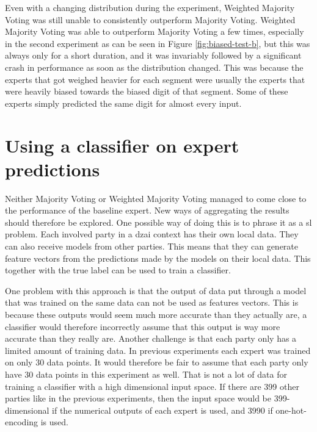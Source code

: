 Even with a changing distribution during the experiment, Weighted Majority Voting was still unable to consistently outperform Majority Voting. Weighted Majority Voting was able to outperform Majority Voting a few times, especially in the second experiment as can be seen in Figure \ref{fig:biased-test-b}, but this was always only for a short duration, and it was invariably followed by a significant crash in performance as soon as the distribution changed. This was because the experts that got weighed heavier for each segment were usually the experts that were heavily biased towards the biased digit of that segment. Some of these experts simply predicted the same digit for almost every input.

\section{Using a classifier on expert predictions}

Neither Majority Voting or Weighted Majority Voting managed to come close to the performance of the baseline expert. New ways of aggregating the results should therefore be explored. One possible way of doing this is to phrase it as a \acrshort{sl} problem.  Each involved party in a \acrshort{dzai} context has their own local data. They can also receive models from other parties. This means that they can generate feature vectors from the predictions made by the models on their local data. This together with the true label can be used to train a classifier.

One problem with this approach is that the output of data put through a model that was trained on the same data can not be used as features vectors. This is because these outputs would seem much more accurate than they actually are, a classifier would therefore incorrectly assume that this output is way more accurate than they really are. Another challenge is that each party only has a limited amount of training data. In previous experiments each expert was trained on only 30 data points. It would therefore be fair to assume that each party only have 30 data points in this experiment as well. That is not a lot of data for training a classifier with a high dimensional input space. If there are 399 other parties like in the previous experiments, then the input space would be 399-dimensional if the numerical outputs of each expert is used, and 3990 if one-hot-encoding is used.

